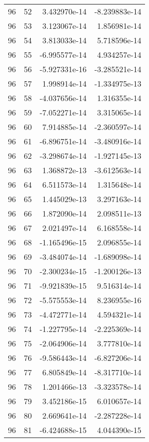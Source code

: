\begin{tabular}{rrrr}
  96 &   52 &  3.432970e-14 & -8.239883e-14 \\
  96 &   53 &  3.123067e-14 &  1.856981e-14 \\
  96 &   54 &  3.813033e-14 &  5.718596e-14 \\
  96 &   55 & -6.995577e-14 &  4.934257e-14 \\
  96 &   56 & -5.927331e-16 & -3.285521e-14 \\
  96 &   57 &  1.998914e-14 & -1.334975e-13 \\
  96 &   58 & -4.037656e-14 &  1.316355e-14 \\
  96 &   59 & -7.052271e-14 &  3.315065e-14 \\
  96 &   60 &  7.914885e-14 & -2.360597e-14 \\
  96 &   61 & -6.896751e-14 & -3.480916e-14 \\
  96 &   62 & -3.298674e-14 & -1.927145e-13 \\
  96 &   63 &  1.368872e-13 & -3.612563e-14 \\
  96 &   64 &  6.511573e-14 &  1.315648e-14 \\
  96 &   65 &  1.445029e-13 &  3.297163e-14 \\
  96 &   66 &  1.872090e-14 &  2.098511e-13 \\
  96 &   67 &  2.021497e-14 &  6.168558e-14 \\
  96 &   68 & -1.165496e-15 &  2.096855e-14 \\
  96 &   69 & -3.484074e-14 & -1.689098e-14 \\
  96 &   70 & -2.300234e-15 & -1.200126e-13 \\
  96 &   71 & -9.921839e-15 &  9.516314e-14 \\
  96 &   72 & -5.575553e-14 &  8.236955e-16 \\
  96 &   73 & -4.472771e-14 &  4.594321e-14 \\
  96 &   74 & -1.227795e-14 & -2.225369e-14 \\
  96 &   75 & -2.064906e-14 &  3.777810e-14 \\
  96 &   76 & -9.586443e-14 & -6.827206e-14 \\
  96 &   77 &  6.805849e-14 & -8.317710e-14 \\
  96 &   78 &  1.201466e-13 & -3.323578e-14 \\
  96 &   79 &  3.452186e-15 &  6.010657e-14 \\
  96 &   80 &  2.669641e-14 & -2.287228e-14 \\
  96 &   81 & -6.424688e-15 &  4.044390e-15 \\

\end{tabular}
